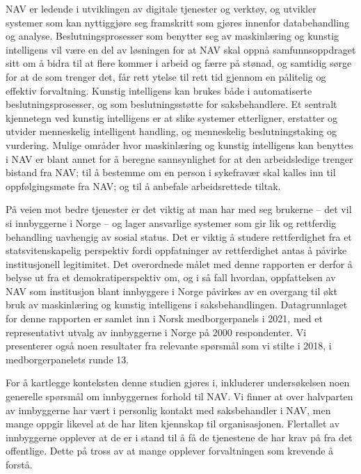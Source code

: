 \documentclass[
]{book}
\begin{document}
NAV er ledende i utviklingen av digitale tjenester og verktøy, og utvikler systemer som kan nyttiggjøre seg framskritt som gjøres innenfor databehandling og analyse.
Beslutningsprosesser som benytter seg av maskinlæring og kunstig intelligens vil være en del av løsningen for at NAV skal oppnå samfunnsoppdraget sitt om å bidra til at flere kommer i arbeid og færre på stønad, og samtidig sørge for at de som trenger det, får rett ytelse til rett tid gjennom en pålitelig og effektiv forvaltning.
Kunstig intelligens kan brukes både i automatiserte beslutningsprosesser, og som beslutningsstøtte for saksbehandlere.
Et sentralt kjennetegn ved kunstig intelligens er at slike systemer etterligner, erstatter og utvider menneskelig intelligent handling, og menneskelig beslutningstaking og vurdering.
Mulige områder hvor maskinlæring og kunstig intelligens kan benyttes i NAV er blant annet for å beregne sannsynlighet for at den arbeidsledige trenger bistand fra NAV; til å bestemme om en person i sykefravær skal kalles inn til oppfølgingsmøte fra NAV; og til å anbefale arbeidsrettede tiltak.

På veien mot bedre tjenester er det viktig at man har med seg brukerne -- det vil si innbyggerne i Norge -- og lager ansvarlige systemer som gir lik og rettferdig behandling uavhengig av sosial status.
Det er viktig å studere rettferdighet fra et statsvitenskapelig perspektiv fordi oppfatninger av rettferdighet antas å påvirke institusjonell legitimitet.
Det overordnede målet med denne rapporten er derfor å belyse ut fra et demokratiperspektiv om, og i så fall hvordan, oppfattelsen av NAV som institusjon blant innbyggere i Norge påvirkes av en overgang til økt bruk av maskinlæring og kunstig intelligens i saksbehandlingen.
Datagrunnlaget for denne rapporten er samlet inn i Norsk medborgerpanels i 2021, med et representativt utvalg av innbyggerne i Norge på 2000 respondenter.
Vi presenterer også noen resultater fra relevante spørsmål som vi stilte i 2018, i medborgerpanelets runde 13.

For å kartlegge konteksten denne studien gjøres i, inkluderer undersøkelsen noen generelle spørsmål om innbyggernes forhold til NAV.
Vi finner at over halvparten av innbyggerne har vært i personlig kontakt med saksbehandler i NAV, men mange oppgir likevel at de har liten kjennskap til organisasjonen.
Flertallet av innbyggerne opplever at de er i stand til å få de tjenestene de har krav på fra det offentlige.
Dette på tross av at mange opplever forvaltningen som krevende å forstå.
\end{document}
